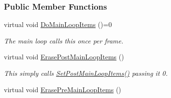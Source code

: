 \subsubsection*{Public Member Functions}
\begin{DoxyCompactItemize}
\item 
virtual void \hyperlink{classphys_1_1ManagerBase_aa9e13a3f7c398b708f0f242610b5abf7}{DoMainLoopItems} ()=0
\begin{DoxyCompactList}\small\item\em The main loop calls this once per frame. \item\end{DoxyCompactList}\item 
\hypertarget{classphys_1_1ManagerBase_a9306dafe9ffe52916b84cf157fbc12d8}{
virtual void \hyperlink{classphys_1_1ManagerBase_a9306dafe9ffe52916b84cf157fbc12d8}{ErasePostMainLoopItems} ()}
\label{classphys_1_1ManagerBase_a9306dafe9ffe52916b84cf157fbc12d8}

\begin{DoxyCompactList}\small\item\em This simply calls \hyperlink{classphys_1_1ManagerBase_a673b3adef73c467f4d90514a5133bf7c}{SetPostMainLoopItems()} passing it 0. \item\end{DoxyCompactList}\item 
\hypertarget{classphys_1_1ManagerBase_aa068aefaf902c87dc641b463ac93ff36}{
virtual void \hyperlink{classphys_1_1ManagerBase_aa068aefaf902c87dc641b463ac93ff36}{ErasePreMainLoopItems} ()}
\label{classphys_1_1ManagerBase_aa068aefaf902c87dc641b463ac93ff36}


\end{DoxyCompactItemize}
